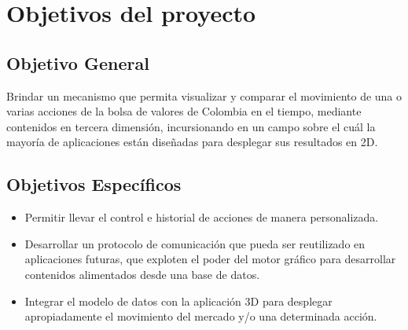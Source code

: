 \chapter{Objetivos del proyecto}
\section{Objetivo General}
Brindar un mecanismo que permita visualizar y comparar el movimiento de una o varias acciones de la bolsa de valores de Colombia en el tiempo, mediante contenidos en tercera dimensión, incursionando en un campo sobre el cuál la mayoría de aplicaciones están diseñadas para desplegar sus resultados en 2D.
\section{Objetivos Específicos}
\begin{itemize}
\item Permitir llevar el control e historial de acciones de manera personalizada.
\item Desarrollar un protocolo de comunicación que pueda ser reutilizado en aplicaciones futuras, que exploten el poder del motor gráfico para desarrollar contenidos alimentados desde una base de datos.
\item Integrar el modelo de datos con la aplicación 3D para desplegar apropiadamente el movimiento del mercado y/o una determinada acción. 
\end{itemize}